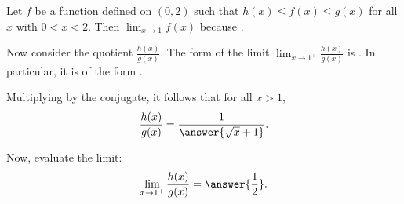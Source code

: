 \documentclass{ximera}
\begin{document}
\begin{exercise}
\begin{multipleChoice}
{
}
\end{multipleChoice} 
\begin{exercise}
Let $f$ be a function defined on $(0,2)$ such that $h(x)\le f(x)\le g(x)$ for all $x$ with $0<x<2$. Then $\lim_{x\to 1}f(x)$  because .
\begin{exercise}
Now consider the quotient $\frac{h(x)}{g(x)}$. The form of the limit $\lim_{x\to 1^+}\frac{h(x)}{g(x)}$ is . In particular, it is of the form .
\begin{exercise}
Multiplying by the conjugate, it follows that for all $x>1$,  
\[
\frac{h(x)}{g(x)}=\frac{1}{\answer{\sqrt{x}+1}}.
\]
\begin{exercise}
Now, evaluate the limit:
\[
\lim_{x\to 1^+}\frac{h(x)}{g(x)}=\answer{\frac{1}{2}}.
\]
\end{exercise}
\end{exercise}
\end{exercise}
\end{exercise}
\end{exercise}
\end{document}
